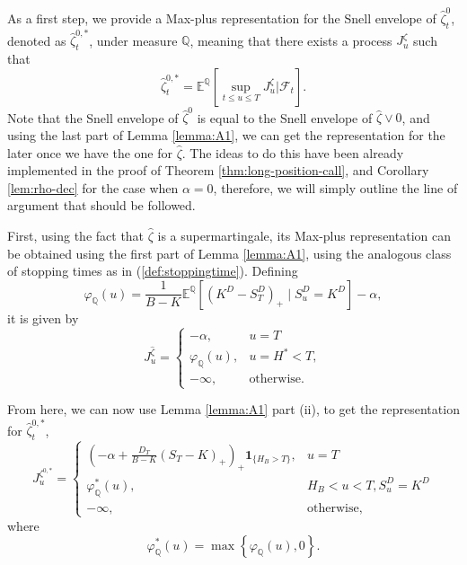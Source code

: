 \documentclass[a4paper]{amsart}
\theoremstyle{definition}
\theoremstyle{remark}
\numberwithin{equation}{section}
\newcommand{\E}{\mathbb{E}}
\newcommand{\Q}{\mathbb{Q}}
\newcommand{\Fc}{\mathcal{F}}
\newcommand{\ind}{\boldsymbol{1}}
\newcommand{\Eq}[1]{\E^{\Q}\left[#1\right]}
\begin{document}
As a first step, we provide a Max-plus representation for the Snell envelope of  $ \hat{\zeta}_t^0$, denoted as $ \hat{\zeta}_t^{0,*}$, under measure $\Q$, meaning that there exists a process $J_u^\zeta$ such that
\[
 \hat{\zeta}_t^{0,*}=\Eq{\sup_{t \le u \le T} J_u^\zeta | \Fc_t}.
 \]
  Note that the Snell envelope of $ \hat{\zeta}^0$ is equal to the Snell envelope of $ \hat{\zeta}\vee 0$,  and using the last part of Lemma \ref{lemma:A1}, we can get the representation for the later once we have the one for  $\hat{\zeta}$. The ideas to do this have been already implemented in the proof of Theorem \ref{thm:long-position-call}, and 
  Corollary \ref{lem:rho-dec} for the case when $\alpha=0$,  therefore, we will simply outline the line of argument that should be followed.
  
  

First, using the fact that $\hat{\zeta}$ is a supermartingale, its Max-plus representation can be obtained using the first part of  Lemma   \ref{lemma:A1}, using the analogous  class of stopping times as in (\ref{def:stoppingtime}). Defining 
$$
\varphi_{\Q}(u)=\frac{1}{B-K}
\Eq{(K^D-S^D_T)_+\;|\;S_u^D=K^D}-\alpha,
$$
it is given by
$$
  J_u^{\hat{\zeta}}=
   \begin{cases}
   -\alpha, &u=T\\
   \varphi_{\Q}(u), &u=H^*<T,\\
   -\infty, &\text{otherwise}.
   \end{cases}
$$

From here, we can now use   Lemma   \ref{lemma:A1} part (ii), to get the representation for  $ \hat{\zeta}_t^{0,*}$,
$$
  J_u^{\zeta^{0,*}}=
   \begin{cases}
   \left(-\alpha+\frac{D_T}{B-K}(S_T-K)_+ \right)_+ \ind_{\{H_B > T\}}, &u=T\\
   \varphi_{\Q}^*(u), &H_B < u<T, S_u^D=K^D\\
   -\infty, &\text{otherwise},
   \end{cases}
$$
where 
$$
\varphi_{\Q}^*(u) = \max\left\{\varphi_{\Q}(u),0\right\}.
$$
\end{document}
